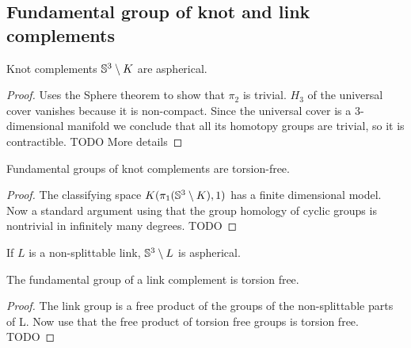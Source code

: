 \subsection{Fundamental group of knot and link complements}

\begin{proposition}
	Knot complements $\mathbb{S}^{3} \setminus K$
	are aspherical.
\end{proposition}
\begin{proof}
	Uses the Sphere theorem to show that $\pi_{2}$ is trivial.
	$H_{3}$ of the universal cover vanishes because it is non-compact.
	Since the universal cover is a $3$-dimensional manifold we conclude that
	all its homotopy groups are trivial, so it is contractible.
	TODO More details
\end{proof}

\begin{corollary}
	Fundamental groups of knot complements are torsion-free.
\end{corollary}

\begin{proof}
	The classifying space $K(\pi_1(\mathbb{S}^{3} \setminus K), 1)$
	has a finite dimensional model.
	Now a standard argument using that the group homology of
	cyclic groups is nontrivial in infinitely many degrees.
	TODO
\end{proof}

\begin{proposition}
	If $L$ is a non-splittable link, $\mathbb{S}^{3} \setminus L$
	is aspherical.
\end{proposition}

\begin{corollary}
	The fundamental group of a link complement is torsion free.
\end{corollary}
\begin{proof}
	The link group is a free product of the groups
	of the non-splittable parts of L.
	Now use that the free product of torsion free groups is
	torsion free. 
	TODO 
\end{proof}





